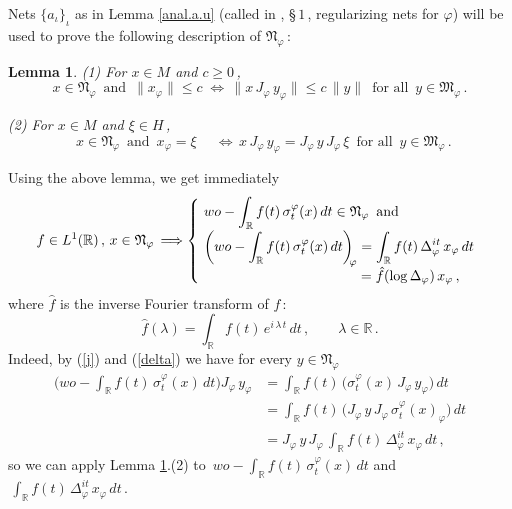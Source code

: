 \documentclass[reqno]{amsart}
\newtheorem{lemma}[theorem]{Lemma}
\theoremstyle{definition}
\theoremstyle{remark}
\numberwithin{equation}{section}
\theoremstyle{plain}
\begin{document}
Nets $\{ a_\iota\}_\iota$ as in Lemma \ref{anal.a.u} (called in
\cite{Z3}, \S$\, 1\,$, regularizing nets for $\varphi$) will be
used to prove the following description of $\mathfrak N_\varphi\,$:
\smallskip

\begin{lemma}\label{char.N}
{\rm (1)} For $x\in M$ and $c\geq 0\,$,
\begin{equation*}
x\in\mathfrak N_\varphi\,\text{ and }\,\| x_\varphi\|\leq c\;
\Longleftrightarrow\,\| x\, J_\varphi\, y_\varphi\|\leq c\,\| y\|\,
\text{ for all }\, y\in\mathfrak M_\varphi\, .
\end{equation*}

{\rm (2)} For $x\in M$ and $\xi\in H\,$,
\begin{equation*} \;\;
x\in\mathfrak N_\varphi\,\text{ and }\, x_\varphi =\xi\,
\phantom{xx}
\Longleftrightarrow\, x\, J_\varphi\, y_\varphi =J_\varphi\, y\,
J_\varphi\,\xi\,\text{ for all }\, y\in\mathfrak M_\varphi\, .
\end{equation*}
\end{lemma}
\smallskip

Using the above lemma, we get immediately
\begin{equation}\label{integr}
f\in L^1(\mathbb R )\, ,\,
x\in\mathfrak N_\varphi\,\Longrightarrow \left\{\!
\begin{array}{l}\displaystyle
wo-\int_{\mathbb R} f(t)\,\sigma^\varphi_t (x)\, dt\in
\mathfrak N_\varphi\,\text{ and} \\ \displaystyle
\bigg( wo-\int_{\mathbb R}^{\substack{{}\\{}}} f(t)\,
\sigma^\varphi_t (x)\, dt \bigg)_{\!\! \varphi} =\int_{\mathbb R} f(t)\,
\Delta_\varphi^{i t}\, x_\varphi\, dt \\
\hspace{3.95 cm} =\hat{f}(\log \Delta_\varphi )\, x_\varphi\, ,
\end{array} \right.
\end{equation}
where $\hat{f}$ is the inverse Fourier transform of $f\,$:
\begin{equation}\label{inv.Fourier}
\hat{f}(\lambda )=\int_{\mathbb R} f(t)\, e^{i\,\lambda\, t}\, dt\, ,
\qquad \lambda\in\mathbb R\, .
\end{equation}
Indeed, by (\ref{j}) and (\ref{delta}) we have for every $y\in
\mathfrak N_\varphi$
\begin{align*}
\bigg( wo-\int_{\mathbb R} f(t)\,\sigma^\varphi_t (x)\, dt\bigg)
J_\varphi\, y_\varphi &=\int_{\mathbb R} f(t)\,\big( \sigma^\varphi_t
(x)\, J_\varphi\, y_\varphi\big)\, dt \\
&=\int_{\mathbb R} f(t)\,\big( J_\varphi\, y\, J_\varphi\,
\sigma^\varphi_t (x)_\varphi\big)\, dt \\
&=J_\varphi\, y\, J_\varphi\, \int_{\mathbb R} f(t)\,
\Delta_\varphi^{i t}\, x_\varphi\, dt\, ,
\end{align*}
so we can apply Lemma \ref{char.N}.(2) to $\,\displaystyle
wo-\int_{\mathbb R} f(t)\,\sigma^\varphi_t (x)\, dt$ and
$\displaystyle \,\int_{\mathbb R} f(t)\, \Delta_\varphi^{i t}\,
x_\varphi\, dt\,$.
\end{document}
